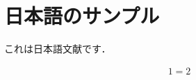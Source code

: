 \documentclass{article}
\begin{document}
\section{日本語のサンプル}

これは日本語文献です．

\begin{align*}
  1 = 2
\end{align*}
\end{document}
